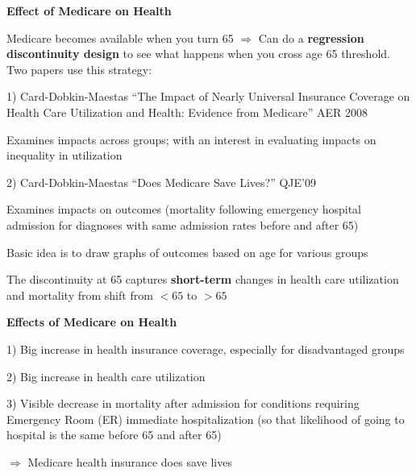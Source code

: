 \documentclass[landscape]{slides}
\begin{document}
\begin{slide}

\end{slide}



\begin{slide}
\begin{center}
{\bf Effect of Medicare on Health}
\end{center}
Medicare becomes available when you turn 65 $\Rightarrow$ Can do a \textbf{regression discontinuity design}
to see what happens when you cross age 65 threshold. Two papers use this strategy:

1) Card-Dobkin-Maestas ``The Impact of Nearly Universal Insurance Coverage on Health Care Utilization and
Health: Evidence from Medicare'' AER 2008

\small
Examines impacts across groups; with an interest in evaluating impacts on
inequality in utilization

\normalsize
2) Card-Dobkin-Maestas ``Does Medicare Save Lives?'' QJE'09

\small
Examines impacts on outcomes (mortality following emergency hospital admission for diagnoses
with same admission rates before and after 65)

\normalsize
Basic idea is to draw graphs of outcomes based on age for various groups

\small
The discontinuity at 65 captures \textbf{short-term} changes in health care utilization and
mortality from shift from $<65$ to $>65$

\end{slide}

\begin{slide}

\end{slide}


\begin{slide}
\begin{center}
{\bf Effects of Medicare on Health}
\end{center}

1) Big increase in health insurance coverage, especially for disadvantaged groups

2) Big increase in health care utilization

3) Visible decrease in mortality after admission for conditions requiring Emergency Room (ER) immediate hospitalization
(so that likelihood of going to hospital is the same before 65 and after 65)

$\Rightarrow$ Medicare health insurance does save lives
\end{slide}
\end{document}
